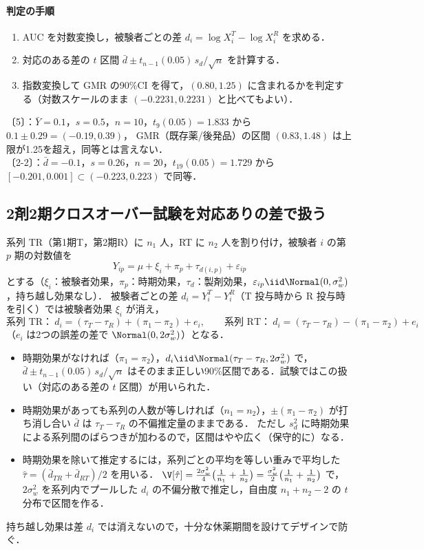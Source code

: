 \paragraph{判定の手順}
\begin{enumerate}
\item AUC を対数変換し，被験者ごとの差 $d_i=\log X_i^T-\log X_i^R$ を求める．
\item 対応のある差の $t$ 区間 $\bar d\pm t_{n-1}(0.05)\,s_d/\sqrt n$ を計算する．
\item 指数変換して GMR の90\%CI を得て，$(0.80,1.25)$ に含まれるかを判定する（対数スケールのまま $(-0.2231,0.2231)$ と比べてもよい）．
\end{enumerate}
〔5〕：$\bar Y=0.1$，$s=0.5$，$n=10$，$t_9(0.05)=1.833$ から $0.1\pm0.29=(-0.19,0.39)$，
GMR（既存薬/後発品）の区間 $(0.83,1.48)$ は上限が1.25を超え，同等とは言えない．\\
〔2-2〕：$\bar d=-0.1$，$s=0.26$，$n=20$，$t_{19}(0.05)=1.729$ から $[-0.201,0.001]\subset(-0.223,0.223)$ で同等．

\subsection{2剤2期クロスオーバー試験を対応ありの差で扱う}\label{subsec:13-crossover}
系列 TR（第1期T，第2期R）に $n_1$ 人，RT に $n_2$ 人を割り付け，被験者 $i$ の第 $p$ 期の対数値を
\[
Y_{ip}=\mu+\xi_i+\pi_p+\tau_{d(i,p)}+\varepsilon_{ip}
\]
とする（$\xi_i$：被験者効果，$\pi_p$：時期効果，$\tau_d$：製剤効果，$\varepsilon_{ip}\iid\Normal(0,\sigma_w^2)$，持ち越し効果なし）．
被験者ごとの差 $d_i=Y_i^T-Y_i^R$（T 投与時から R 投与時を引く）では被験者効果 $\xi_i$ が消え，
\[
\text{系列 TR：}\ d_i=(\tau_T-\tau_R)+(\pi_1-\pi_2)+e_i,\qquad
\text{系列 RT：}\ d_i=(\tau_T-\tau_R)-(\pi_1-\pi_2)+e_i
\]
（$e_i$ は2つの誤差の差で $\Normal(0,2\sigma_w^2)$）となる．
\begin{itemize}
\item 時期効果がなければ（$\pi_1=\pi_2$），$d_i\iid\Normal(\tau_T-\tau_R,2\sigma_w^2)$ で，$\bar d\pm t_{n-1}(0.05)\,s_d/\sqrt n$ はそのまま正しい90\%区間である．試験ではこの扱い（対応のある差の $t$ 区間）が用いられた．
\item 時期効果があっても系列の人数が等しければ（$n_1=n_2$），$\pm(\pi_1-\pi_2)$ が打ち消し合い $\bar d$ は $\tau_T-\tau_R$ の不偏推定量のままである．
      ただし $s_d^2$ に時期効果による系列間のばらつきが加わるので，区間はやや広く（保守的に）なる．
\item 時期効果を除いて推定するには，系列ごとの平均を等しい重みで平均した $\hat\tau=(\bar d_{TR}+\bar d_{RT})/2$ を用いる．
      $\V[\hat\tau]=\frac{2\sigma_w^2}{4}\bigl(\frac1{n_1}+\frac1{n_2}\bigr)=\frac{\sigma_w^2}{2}\bigl(\frac1{n_1}+\frac1{n_2}\bigr)$ で，$2\sigma_w^2$ を系列内でプールした $d_i$ の不偏分散で推定し，自由度 $n_1+n_2-2$ の $t$ 分布で区間を作る．
\end{itemize}
持ち越し効果は差 $d_i$ では消えないので，十分な休薬期間を設けてデザインで防ぐ．

